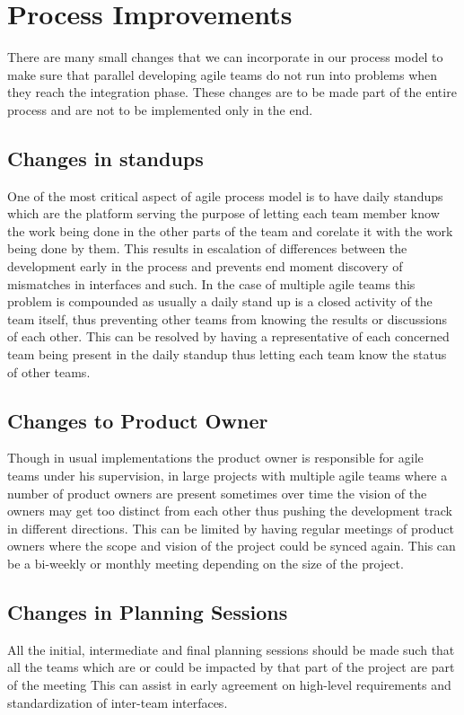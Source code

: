 \section{Process Improvements} 
\label{sec:proc_impv}
	There are many small changes \cite{collabAcrossAgile_article} that we can incorporate in our process model to make sure that parallel developing agile teams do not run into problems when they reach the integration phase. These changes are to be made part of the entire process and are not to be implemented only in the end.

\subsection{Changes in standups}
	One of the most critical aspect of agile process model is to have daily standups which are the platform serving the purpose of letting each team member know the work being done in the other parts of the team and corelate it with the work being done by them. This results in escalation of differences between the development early in the process and prevents end moment discovery of mismatches in interfaces and such. In the case of multiple agile teams this problem is compounded as usually a daily stand up is a closed activity of the team itself, thus preventing other teams from knowing the results or discussions of each other. This can be resolved by having a representative of each concerned team being present in the daily standup thus letting each team know the status of other teams.

\subsection{Changes to Product Owner}
	Though in usual implementations the product owner is responsible for agile teams under his supervision, in large projects with multiple agile teams where a number of product owners are present sometimes over time the vision of the owners may get too distinct from each other thus pushing the development track in different directions. This can be limited by having regular meetings of product owners where the scope and vision of the project could be synced again. This can be a bi-weekly or monthly meeting depending on the size of the project.

\subsection{Changes in Planning Sessions}
	All the initial, intermediate and final planning sessions should be made such that all the teams which are or could be impacted by that part of the project are part of the meeting This can assist in early agreement on high-level requirements and standardization of inter-team interfaces.

